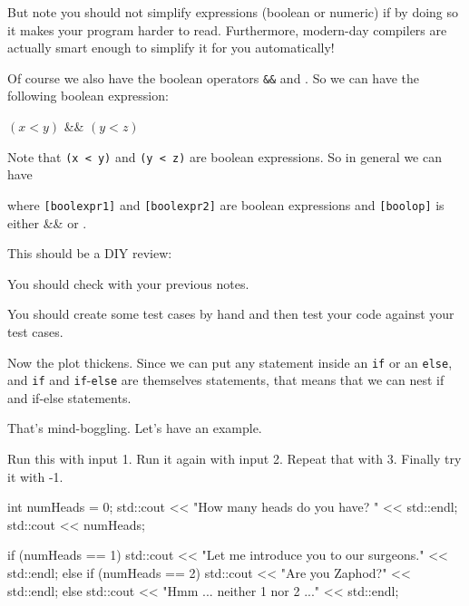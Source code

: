 
But note you should not simplify expressions (boolean or numeric) if by
doing so it makes your program harder to read. Furthermore, modern-day
compilers are actually smart enough to simplify it for you
automatically!

Of course we also have the boolean operators \texttt{\&\&} and
\texttt{\textbar\textbar}. So we can have the following boolean
expression:
\begin{center}
$(x < y)$   \&\&  $(y < z)$
\end{center}
Note that \texttt{(x < y)} and \texttt{(y < z)} are
boolean expressions. So in general we can have
\begin{center}
\EMPHASIZE{\texttt{[boolexpr1] [boolop] [boolexpr2]}}
\end{center}
where \texttt{[boolexpr1]} and \texttt{[boolexpr2]} are boolean
expressions and \texttt{[boolop]} is either \&\& or \textbar\textbar.

This should be a DIY review:


You should check with your previous notes.

You should create some test cases by hand and then test your code
against your test cases.

\newpage{}

Now the plot thickens. Since we can put any statement inside an \texttt{if} or an \texttt{else}, and \texttt{if} and \texttt{if}-\texttt{else} are themselves statements, that means that we can nest if and if-else statements.

That's mind-boggling. Let's have an example.

Run this with input 1. Run it again with input 2. Repeat that with 3.
Finally try it with -1.
\begin{console}
int numHeads = 0;
std::cout << "How many heads do you have? " << std::endl;
std::cout << numHeads;

if (numHeads == 1)
{
    std::cout << "Let me introduce you to our surgeons."
              << std::endl;
}
else
{
    if (numHeads == 2)
    {
        std::cout << "Are you Zaphod?" << std::endl;
    }
    else
    {
        std::cout << "Hmm ... neither 1 nor 2 ..."
                  << std::endl;
    }
}
\end{console}

